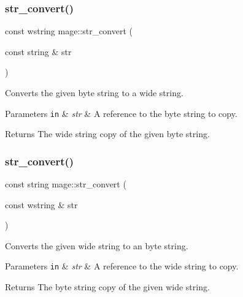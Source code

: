 \subsubsection{\texorpdfstring{str\+\_\+convert()}{str\_convert()}\hspace{0.1cm}{\footnotesize\ttfamily [3/4]}}
{\footnotesize\ttfamily const wstring mage\+::str\+\_\+convert (\begin{DoxyParamCaption}\item[{const string \&}]{str }\end{DoxyParamCaption})}

Converts the given byte string to a wide string.


\begin{DoxyParams}[1]{Parameters}
\mbox{\tt in}  & {\em str} & A reference to the byte string to copy. \\
\hline
\end{DoxyParams}
\begin{DoxyReturn}{Returns}
The wide string copy of the given byte string. 
\end{DoxyReturn}
\hypertarget{namespacemage_a5425aab167b483cdf05a6aaf0d074ed1}{}\label{namespacemage_a5425aab167b483cdf05a6aaf0d074ed1} 
\subsubsection{\texorpdfstring{str\+\_\+convert()}{str\_convert()}\hspace{0.1cm}{\footnotesize\ttfamily [4/4]}}
{\footnotesize\ttfamily const string mage\+::str\+\_\+convert (\begin{DoxyParamCaption}\item[{const wstring \&}]{str }\end{DoxyParamCaption})}

Converts the given wide string to an byte string.


\begin{DoxyParams}[1]{Parameters}
\mbox{\tt in}  & {\em str} & A reference to the wide string to copy. \\
\hline
\end{DoxyParams}
\begin{DoxyReturn}{Returns}
The byte string copy of the given wide string. 
\end{DoxyReturn}
\hypertarget{namespacemage_a68b152487f458f47538999e2c21812bf}{}\label{namespacemage_a68b152487f458f47538999e2c21812bf} 
